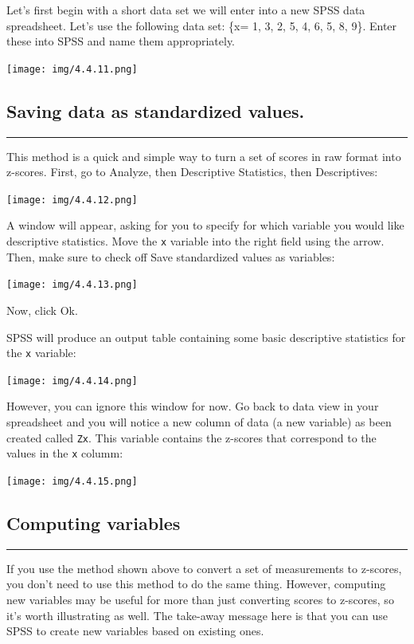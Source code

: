 \documentclass[]{book}
\begin{document}
Let's first begin with a short data set we will enter into a new SPSS
data spreadsheet. Let's use the following data set: \{x= 1, 3, 2, 5, 4,
6, 5, 8, 9\}. Enter these into SPSS and name them appropriately.

\texttt{[image: img/4.4.11.png]}

\subsection{Saving data as standardized
values.}\label{saving-data-as-standardized-values.}

\begin{center}\rule{0.5\linewidth}{0.5pt}\end{center}

This method is a quick and simple way to turn a set of scores in raw
format into z-scores. First, go to {Analyze}, then {Descriptive
Statistics}, then {Descriptives}:

\texttt{[image: img/4.4.12.png]}

A window will appear, asking for you to specify for which variable you
would like descriptive statistics. Move the \texttt{x} variable into the
right field using the arrow. Then, make sure to check off {Save
standardized values as variables}:

\texttt{[image: img/4.4.13.png]}

Now, click {Ok}.

SPSS will produce an output table containing some basic descriptive
statistics for the \texttt{x} variable:

\texttt{[image: img/4.4.14.png]}

However, you can ignore this window for now. Go back to data view in
your spreadsheet and you will notice a new column of data (a new
variable) as been created called \texttt{Zx}. This variable contains the
z-scores that correspond to the values in the \texttt{x} columm:

\texttt{[image: img/4.4.15.png]}

\subsection{Computing variables}\label{computing-variables}

\begin{center}\rule{0.5\linewidth}{0.5pt}\end{center}

If you use the method shown above to convert a set of measurements to
z-scores, you don't need to use this method to do the same thing.
However, computing new variables may be useful for more than just
converting scores to z-scores, so it's worth illustrating as well. The
take-away message here is that you can use SPSS to create new variables
based on existing ones.
\end{document}
